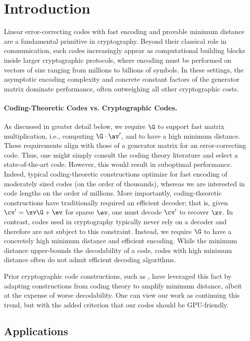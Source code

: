 \section{Introduction}\label{sec:intro}
Linear error-correcting codes with fast encoding and provable minimum distance are a fundamental primitive in cryptography. Beyond their classical role in communication, such codes increasingly appear as computational building blocks inside larger cryptographic protocols, where encoding must be performed on vectors of size ranging from millions to billions of symbols. In these settings, the asymptotic encoding complexity and concrete constant factors of the generator matrix dominate performance, often outweighing all other cryptographic costs.


\paragraph{Coding-Theoretic Codes vs. Cryptographic Codes.} As discussed in greater detail below, we require $\G$ to support fast matrix multiplication, i.e., computing $\G \cdot \av'$, and to have a high minimum distance. These requirements align with those of a generator matrix for an error-correcting code. Thus, one might simply consult the coding theory literature and select a state-of-the-art code. However, this would result in suboptimal performance. Indeed, typical coding-theoretic constructions optimize for fast encoding of moderately sized codes (on the order of thousands), whereas we are interested in code lengths on the order of millions. More importantly, coding-theoretic constructions have traditionally required an efficient decoder; that is, given $\cv' = \xv\G + \ev$ for sparse $\ev$, one must decode $\cv'$ to recover $\xv$. In contrast, codes used in cryptography typically never rely on a decoder and therefore are not subject to this constraint. Instead, we require $\G$ to have a concretely high minimum distance and efficient encoding. While the minimum distance upper-bounds the decodability of a code, codes with high minimum distance often do not admit efficient decoding algorithms. 

Prior cryptographic code constructions, such as \cite{silver,EA,EC}, have leveraged this fact by adapting constructions from coding theory to amplify minimum distance, albeit at the expense of worse decodability. One can view our work as continuing this trend, but with the added criterion that our codes should be GPU-friendly. 

\subsection{Applications}



